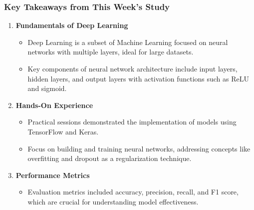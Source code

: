 \documentclass{beamer}
\begin{document}
\begin{frame}[fragile]
    \frametitle{Key Takeaways from This Week's Study}
    \begin{enumerate}
        \item \textbf{Fundamentals of Deep Learning}
            \begin{itemize}
                \item Deep Learning is a subset of Machine Learning focused on neural networks with multiple layers, ideal for large datasets.
                \item Key components of neural network architecture include input layers, hidden layers, and output layers with activation functions such as ReLU and sigmoid.
            \end{itemize}
        
        \item \textbf{Hands-On Experience}
            \begin{itemize}
                \item Practical sessions demonstrated the implementation of models using TensorFlow and Keras.
                \item Focus on building and training neural networks, addressing concepts like overfitting and dropout as a regularization technique.
            \end{itemize}
        
        \item \textbf{Performance Metrics}
            \begin{itemize}
                \item Evaluation metrics included accuracy, precision, recall, and F1 score, which are crucial for understanding model effectiveness.
            \end{itemize}
    \end{enumerate}
\end{frame}
\end{document}

